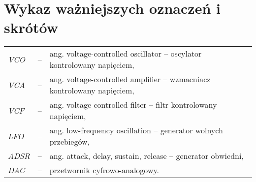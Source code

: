 \chapter*{Wykaz ważniejszych oznaczeń i skrótów}

\begin{tabular}{lcl}
	
	\textit{VCO} & -- & ang. voltage-controlled oscillator -- oscylator kontrolowany napięciem, \\
	\textit{VCA} & -- & ang. voltage-controlled amplifier -- wzmacniacz kontrolowany napięciem, \\
	\textit{VCF} & -- & ang. voltage-controlled filter -- filtr kontrolowany napięciem, \\
	\textit{LFO} & -- & ang. low-frequency oscillation -- generator wolnych przebiegów, \\
	\textit{ADSR} & -- & ang. attack, delay, sustain, release -- generator obwiedni, \\
	\textit{DAC} & -- & przetwornik cyfrowo-analogowy. \\
\end{tabular} 
